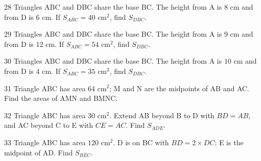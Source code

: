 \gap
\begin{probbox}{28}{\relax}
Triangles ABC and DBC share the base BC. The height from A is $8$ cm and from D is $6$ cm. If $S_{ABC}=40$ cm$^2$, find $S_{DBC}$.
\end{probbox}
\gap
\begin{probbox}{29}{\relax}
Triangles ABC and DBC share the base BC. The height from A is $9$ cm and from D is $12$ cm. If $S_{ABC}=54$ cm$^2$, find $S_{DBC}$.
\end{probbox}
\gap
\begin{probbox}{30}{\relax}
Triangles ABC and DBC share the base BC. The height from A is $10$ cm and from D is $4$ cm. If $S_{ABC}=35$ cm$^2$, find $S_{DBC}$.
\end{probbox}
\begin{probbox}{31}{}
Triangle ABC has area $64$ cm$^2$; M and N are the midpoints of AB and AC. Find the areas of AMN and BMNC.
\end{probbox}
\gap
\begin{probbox}{32}{}
Triangle ABC has area $30$ cm$^2$. Extend AB beyond B to D with $BD=AB$, and AC beyond C to E with $CE=AC$. Find $S_{ADE}$.
\end{probbox}
\gap
\begin{probbox}{33}{}
Triangle ABC has area $120$ cm$^2$. D is on BC with $BD=2\times DC$; E is the midpoint of AD. Find $S_{BEC}$.
\end{probbox}
